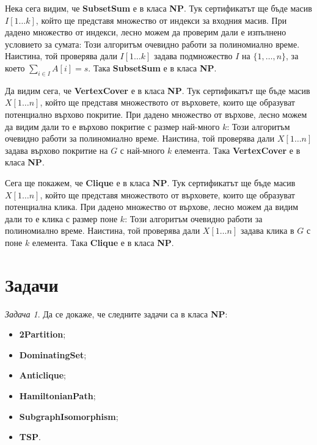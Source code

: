 \documentclass{article}
\theoremstyle{definition}
\theoremstyle{plain}
\theoremstyle{remark}
\newtheorem{problem}{Задача}
\theoremstyle{definition}
\begin{document}
Нека сега видим, че \textbf{SubsetSum} е в класа \textbf{NP}.
Тук сертификатът ще бъде масив $I[1 \dots k]$, който ще представя множество от индекси за входния масив.
При дадено множество от индекси, лесно можем да проверим дали е изпълнено условието за сумата:
Този алгоритъм очевидно работи за полиномиално време.
Наистина, той проверява дали $I[1 \dots k]$ задава подмножество $I$ на $\{ 1, \dots, n \}$, за което $\sum\limits_{i \in I} A[i] = s$.
Така \textbf{SubsetSum} е в класа \textbf{NP}.

\pagebreak

Да видим сега, че \textbf{VertexCover} е в класа \textbf{NP}.
Тук сертификатът ще бъде масив $X[1 \dots n]$, който ще представя множеството от върховете, които ще образуват потенциално върхово покритие.
При дадено множество от върхове, лесно можем да видим дали то е върхово покритие с размер най-много $k$:
Този алгоритъм очевидно работи за полиномиално време.
Наистина, той проверява дали $X[1 \dots n]$ задава върхово покритие на $G$ с най-много $k$ елемента.
Така \textbf{VertexCover} е в класа \textbf{NP}.

Сега ще покажем, че \textbf{Clique} е в класа \textbf{NP}.
Тук сертификатът ще бъде масив $X[1 \dots n]$, който ще представя множеството от върховете, които ще образуват потенциална клика.
При дадено множество от върхове, лесно можем да видим дали то е клика с размер поне $k$:
Този алгоритъм очевидно работи за полиномиално време.
Наистина, той проверява дали $X[1 \dots n]$ задава клика в $G$ с поне $k$ елемента.
Така \textbf{Clique} е в класа \textbf{NP}.

\section*{Задачи}

\begin{problem}
Да се докаже, че следните задачи са в класа \textbf{NP}:
\begin{itemize}
      \item \textbf{2Partition};
      \item \textbf{DominatingSet};
      \item \textbf{Anticlique};
      \item \textbf{HamiltonianPath};
      \item \textbf{SubgraphIsomorphism};
      \item \textbf{TSP}.
\end{itemize}
\end{problem}
\end{document}

